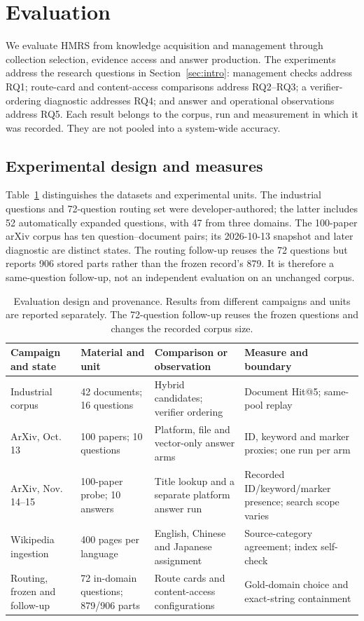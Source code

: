 \section{Evaluation}
\label{sec:eval}
We evaluate HMRS from knowledge acquisition and management through collection
selection, evidence access and answer production. The experiments address the
research questions in Section~\ref{sec:intro}: management checks address RQ1;
route-card and content-access comparisons address RQ2--RQ3; a verifier-ordering
diagnostic addresses RQ4; and answer and operational observations address
RQ5. Each result belongs to the corpus, run and measurement in which it was
recorded. They are not pooled into a system-wide accuracy.

\subsection{Experimental design and measures}
\label{sec:eval-setup}
Table~\ref{tab:eval-design} distinguishes the datasets and experimental units.
The industrial questions and 72-question routing set were developer-authored;
the latter includes 52 automatically expanded questions, with 47 from three
domains. The 100-paper arXiv corpus has ten question--document pairs; its
2026-10-13 snapshot and later diagnostic are distinct states. The routing
follow-up reuses the 72 questions but reports 906 stored parts rather than the
frozen record's 879. It is therefore a same-question follow-up, not an
independent evaluation on an unchanged corpus.

\begin{table}[t]
\centering
\small
\setlength{\tabcolsep}{4pt}
\caption{Evaluation design and provenance. Results from different campaigns
and units are reported separately. The 72-question follow-up reuses the frozen
questions and changes the recorded corpus size.}
\label{tab:eval-design}
\begin{tabular}{@{}p{}p{}p{}p{}@{}}
\toprule
Campaign and state & Material and unit & Comparison or observation & Measure and boundary \\
\midrule
Industrial corpus & 42 documents; 16 questions & Hybrid candidates; verifier ordering & Document Hit@5; same-pool replay \\
ArXiv, Oct. 13 & 100 papers; 10 questions & Platform, file and vector-only answer arms & ID, keyword and marker proxies; one run per arm \\
ArXiv, Nov. 14--15 & 100-paper probe; 10 answers & Title lookup and a separate platform answer run & Recorded ID/keyword/marker presence; search scope varies \\
Wikipedia ingestion & 400 pages per language & English, Chinese and Japanese assignment & Source-category agreement; index self-check \\
Routing, frozen and follow-up & 72 in-domain questions; 879/906 parts & Route cards and content-access configurations & Gold-domain choice and exact-string containment \\
\bottomrule
\end{tabular}
\end{table}


